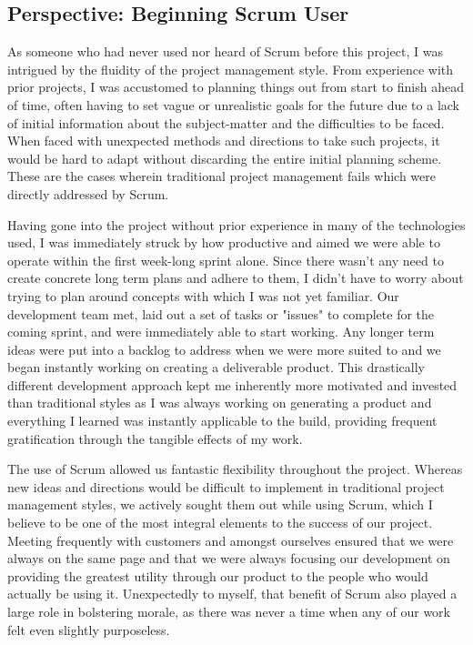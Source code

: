 \documentclass[openright]{report}
\begin{document}
\subsection{Perspective: Beginning Scrum User}
\par As someone who had never used nor heard of Scrum before this project, I was intrigued by the fluidity of the project management style. From experience with prior projects, I was accustomed to planning things out from start to finish ahead of time, often having to set vague or unrealistic goals for the future due to a lack of initial information about the subject-matter and the difficulties to be faced. When faced with unexpected methods and directions to take such projects, it would be hard to adapt without discarding the entire initial planning scheme. These are the cases wherein traditional project management fails which were directly addressed by Scrum. 

\par Having gone into the project without prior experience in many of the technologies used, I was immediately struck by how productive and aimed we were able to operate within the first week-long sprint alone. Since there wasn't any need to create concrete long term plans and adhere to them, I didn't have to worry about trying to plan around concepts with which I was not yet familiar. Our development team met, laid out a set of tasks or "issues" to complete for the coming sprint, and were immediately able to start working. Any longer term ideas were put into a backlog to address when we were more suited to and we began instantly working on creating a deliverable product. This drastically different development approach kept me inherently more motivated and invested than traditional styles as I was always working on generating a product and everything I learned was instantly applicable to the build, providing frequent gratification through the tangible effects of my work. 

\par The use of Scrum allowed us fantastic flexibility throughout the project. Whereas new ideas and directions would be difficult to implement in traditional project management styles, we actively sought them out while using Scrum, which I believe to be one of the most integral elements to the success of our project. Meeting frequently with customers and amongst ourselves ensured that we were always on the same page and that we were always focusing our development on providing the greatest utility through our product to the people who would actually be using it. Unexpectedly to myself, that benefit of Scrum also played a large role in bolstering morale, as there was never a time when any of our work felt even slightly purposeless. 
\end{document}

